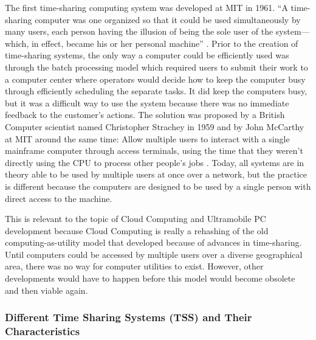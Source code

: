 \documentclass[12pt,oneside,letterpaper,titlepage]{article}
\begin{document}
The first time-sharing computing system was developed at MIT in 1961.  ``A
time-sharing computer was one organized so that it could be used simultaneously
by many users, each person having the illusion of being the sole user of the
system---which, in effect, became his or her personal machine''
\citep{kelly2004}.  Prior to the creation of time-sharing systems, the only
way a computer could be efficiently used was through the batch processing model
which required users to submit their work to a computer center where operators
would decide how to keep the computer busy through efficiently scheduling the
separate tasks.  It did keep the computers busy, but it was a difficult way to
use the system because there was no immediate feedback to the customer's
actions.  The solution was proposed by a British Computer scientist named
Christopher Strachey in 1959 and by John McCarthy at MIT around the same time:
Allow multiple users to interact with a single mainframe computer through access
terminals, using the time that they weren't directly using the CPU to process
other people's jobs \citep{kelly2004}.  Today, all systems are in theory able
to be used by multiple users at once over a network, but the practice is
different because the computers are designed to be used by a single person with
direct access to the machine.

This is relevant to the topic of Cloud Computing and Ultramobile PC development
because Cloud Computing is really a rehashing of the old computing-as-utility
model that developed because of advances in time-sharing.  Until computers could
be accessed by multiple users over a diverse geographical area, there was no way
for computer utilities to exist.  However, other developments would have to
happen before this model would become obsolete and then viable again.

\subsubsection{Different Time Sharing Systems (TSS) and Their Characteristics}
\end{document}
